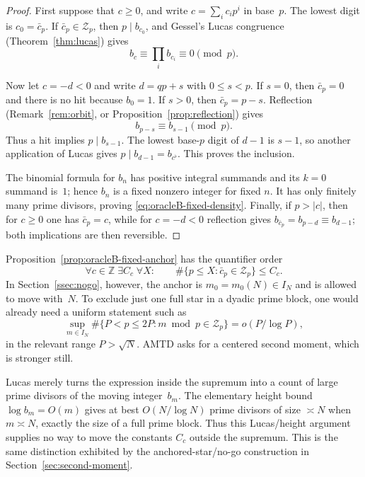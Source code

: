 \begin{proof}
First suppose that $c\geq0$, and write $c=\sum_i c_ip^i$ in base~$p$.
The lowest digit is $c_0=\bar c_p$.  If
$\bar c_p\in\mathcal Z_p$, then $p\mid b_{c_0}$, and Gessel's
Lucas congruence (Theorem~\ref{thm:lucas}) gives
\[
 b_c\equiv\prod_i b_{c_i}\equiv0\pmod p.
\]

Now let $c=-d<0$ and write $d=qp+s$ with $0\leq s<p$.  If $s=0$,
then $\bar c_p=0$ and there is no hit because $b_0=1$.  If $s>0$,
then $\bar c_p=p-s$.  Reflection (Remark~\ref{rem:orbit}, or
Proposition~\ref{prop:reflection}) gives
\[
 b_{p-s}\equiv b_{s-1}\pmod p.
\]
Thus a hit implies $p\mid b_{s-1}$.  The lowest base-$p$ digit of
$d-1$ is $s-1$, so another application of Lucas gives
$p\mid b_{d-1}=b_{c^\flat}$.  This proves the inclusion.

The binomial formula for $b_n$ has positive integral summands and its
$k=0$ summand is~$1$; hence $b_n$ is a fixed nonzero integer for fixed
$n$.  It has only finitely many prime divisors, proving
\eqref{eq:oracleB-fixed-density}.  Finally, if $p>|c|$, then for
$c\geq0$ one has $\bar c_p=c$, while for $c=-d<0$ reflection gives
$b_{\bar c_p}=b_{p-d}\equiv b_{d-1}$; both implications are then
reversible.
\end{proof}

\begin{remark}
\label{rem:oracleB-quantifiers}
Proposition~\ref{prop:oracleB-fixed-anchor} has the quantifier order
\begin{equation}
 \forall c\in\mathbb Z\;\exists C_c\;\forall X:\qquad
 \#\{p\leq X:\bar c_p\in\mathcal Z_p\}\leq C_c.
 \label{eq:oracleB-fixed-quantifiers}
\end{equation}
In Section~\ref{ssec:nogo}, however, the anchor is
$m_0=m_0(N)\in I_N$ and is allowed to move with~$N$.  To exclude just
one full star in a dyadic prime block, one would already need a uniform
statement such as
\begin{equation}
 \sup_{m\in I_N}
 \#\{P<p\leq2P:m\bmod p\in\mathcal Z_p\}
   =o(P/\log P),
 \label{eq:oracleB-moving-anchor}
\end{equation}
in the relevant range $P>\sqrt N$.  AMTD asks for a centered second
moment, which is stronger still.

Lucas merely turns the expression inside the supremum into a count of
large prime divisors of the moving integer~$b_m$.  The elementary height
bound $\log b_m=O(m)$ gives at best $O(N/\log N)$ prime divisors of size
$\asymp N$ when $m\asymp N$, exactly the size of a full prime block.
Thus this Lucas/height argument supplies no way to move the constants
$C_c$ outside the supremum.  This is the same distinction exhibited
by the anchored-star/no-go construction in
Section~\ref{sec:second-moment}.
\end{remark}

